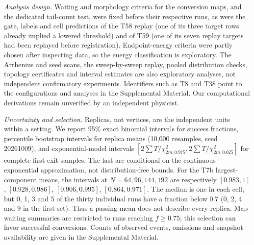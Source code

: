 \documentclass[aps,pre,10pt,twocolumn,superscriptaddress,nofootinbib]{revtex4-2}
\begin{document}
\emph{Analysis design.} Waiting and morphology criteria for the conversion maps, and the dedicated
tail-count test, were fixed before their respective runs, as were the gate, labels and cell
predictions of the T58 replay (one of its three target rows already implied a lowered threshold)
and of T59 (one of its seven replay targets had been replayed before registration). Endpoint-energy criteria were partly
chosen after inspecting data, so the energy classification is exploratory. The Arrhenius and seed
scans, the sweep-by-sweep replay, pooled distribution checks, topology certificates and interval estimates are also exploratory
analyses, not independent confirmatory experiments. Identifiers such as T8 and T38 point to the
configurations and analyses in the Supplemental Material.
Our computational derivations remain unverified by an independent physicist.

\emph{Uncertainty and selection.} Replicas, not vertices, are the independent units within a setting. We report 95\% exact binomial intervals for success fractions, percentile bootstrap intervals
for replica means (10,000 resamples, seed 20261009), and exponential-model intervals
$[2\sum T/\chi^2_{2m,0.975},2\sum T/\chi^2_{2m,0.025}]$ for complete first-exit samples.
The last are conditional on the continuous exponential approximation, not distribution-free bounds.
For the T7b largest-component means, the intervals at $N=64,96,144,192$ are respectively
$[0.983,1]$, $[0.928,0.986]$, $[0.906,0.995]$, $[0.864,0.971]$.
The median is one in each cell, but 0, 1, 3 and 5 of the thirty individual runs have a fraction
below 0.7 (0, 2, 4 and 9 in the first set). Thus a passing mean does not describe every replica.
Map waiting summaries are restricted to runs reaching $f\ge0.75$; this selection
can favor successful conversions. Counts of observed events, omissions and snapshot availability
are given in the Supplemental Material.
\end{document}
